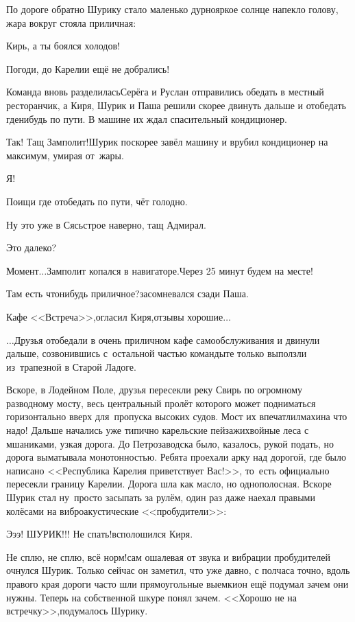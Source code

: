 По дороге обратно Шурику стало маленько дурно\mdash яркое солнце напекло голову, жара вокруг стояла приличная:

\diagdash Кирь, а ты боялся холодов!

\diagdash Погоди, до Карелии ещё не добрались!

Команда вновь разделилась\mdash Серёга и Руслан отправились обедать в местный ресторанчик, а Киря, Шурик и Паша решили скорее двинуть дальше и отобедать где\sdash нибудь по пути. В машине их ждал спасительный кондиционер.

\diagdash Так! Тащ Замполит!\mdash Шурик поскорее завёл машину и врубил кондиционер на максимум, умирая от~жары.

\diagdash Я!

\diagdash Поищи где отобедать по пути, чёт голодно.

\diagdash Ну это уже в Сясьстрое наверно, тащ Адмирал.

\diagdash Это далеко?

\diagdash Момент$\ldots$\mdash Замполит копался в навигаторе.\mdash Через 25 минут будем на месте!

\diagdash Там есть что\sdash нибудь приличное?\mdash засомневался сзади Паша.

\diagdash Кафе <<Встреча>>,\mdash огласил Киря,\mdash отзывы хорошие$\ldots$

$\ldots$Друзья отобедали в очень приличном кафе самообслуживания и двинули дальше, созвонившись с~остальной частью команды\mdash те только выползли из~трапезной в Старой Ладоге. 

Вскоре, в Лодейном Поле, друзья пересекли реку Свирь по огромному разводному мосту, весь центральный пролёт которого может подниматься горизонтально вверх для~пропуска высоких судов. Мост их впечатлил\mdash махина что надо! Дальше начались уже типично карельские пейзажи\mdash хвойные леса с мшаниками, узкая дорога. До Петрозаводска было, казалось, рукой подать, но дорога выматывала монотонностью. Ребята проехали арку над дорогой, где было написано <<Республика Карелия приветствует Вас!>>, то~есть официально пересекли границу Карелии. Дорога шла как масло, но однополосная. Вскоре Шурик стал ну~просто засыпать за рулём, один раз даже наехал правыми колёсами на вибро\sdash акустические <<пробудители>>:

\diagdash Э\sdash э\sdash э! ШУРИК!!! Не спать!\mdash всполошился Киря.

\diagdash Не сплю, не сплю, всё норм!\mdash сам ошалевая от звука и вибрации пробудителей очнулся Шурик. Только сейчас он заметил, что уже давно, с полчаса точно, вдоль правого края дороги часто шли прямоугольные выемки\mdash он ещё подумал зачем они нужны. Теперь на собственной шкуре понял зачем. <<Хорошо не на встречку>>,\mdash подумалось Шурику.

